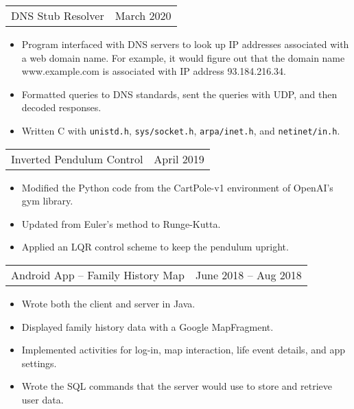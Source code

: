 \documentclass{article}
\newenvironment{compactItemize}{
  \begin{itemize}[itemsep=0ex, parsep=0ex, partopsep=0ex, topsep= -7pt]
}{
  \end{itemize}
}
\newcommand{\project}[2]{
  \begingroup
  \setlength{\tabcolsep}{0ex}
  \begin{tabularx}{\linewidth}{X r}
    #1 & %
    #2\\ %
  \end{tabularx}%
  \endgroup%
}
\begin{document}
\project{DNS Stub Resolver}{March 2020}
\begin{compactItemize}
  \item Program interfaced with DNS servers to look up IP addresses associated with a web domain name.
        For example, it would figure out that the domain name www.example.com is associated with IP address 93.184.216.34.
  \item Formatted queries to DNS standards, sent the queries with UDP, and then decoded responses.
  \item Written C with \texttt{unistd.h}, \texttt{sys/socket.h}, \texttt{arpa/inet.h}, and \texttt{netinet/in.h}.
\end{compactItemize}
\medskip
\begin{comment}
\project{OpenMP with Mandelbrot Set}{March 2020}
\begin{compactItemize}
  \item Parallelized the \href{https://gist.github.com/andrejbauer/7919569}{Mandelbrot visualization code} posted on github by Andrej Bauer.
\end{compactItemize}
\medskip

\project{Tiny Shell}{February 2020}
\begin{compactItemize}
  \item Wrote a simple shell that could handle process creation, I/O redirection and pipelines, and process control.
  \item Used C with \texttt{unistd.h} and \texttt{signal.h}.
\end{compactItemize}
\medskip
\end{comment}
\project{Inverted Pendulum Control}{April 2019}
\begin{compactItemize}
  \item Modified the Python code from the CartPole-v1 environment of OpenAI's gym library.
  \item Updated from Euler's method to Runge-Kutta.
  \item Applied an LQR control scheme to keep the pendulum upright.
\end{compactItemize}
\medskip

\project{Android App -- Family History Map}{June 2018 -- Aug 2018}
\begin{compactItemize}
  \item Wrote both the client and server in Java.
  \item Displayed family history data with a Google MapFragment.
  \item Implemented activities for log-in, map interaction, life event details, and app settings.
  \item Wrote the SQL commands that the server would use to store and retrieve user data.
\end{compactItemize}
\end{document}
